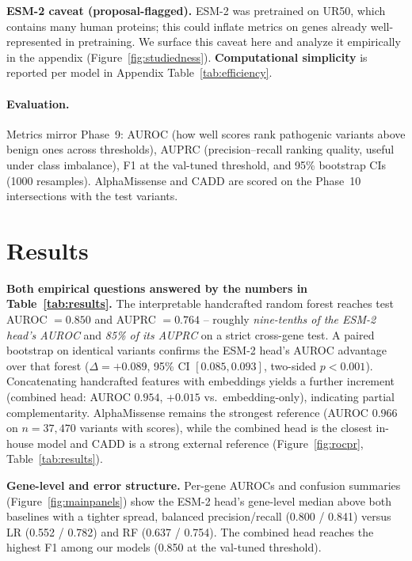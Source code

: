 \documentclass[11pt,letterpaper]{article}
\begin{document}
\textbf{ESM-2 caveat (proposal-flagged).} ESM-2 was pretrained on UR50, which contains many human proteins; this could inflate metrics on genes already well-represented in pretraining. We surface this caveat here and analyze it empirically in the appendix (Figure~\ref{fig:studiedness}). \textbf{Computational simplicity} is reported per model in Appendix Table~\ref{tab:efficiency}.

\paragraph{Evaluation.}
Metrics mirror Phase~9: AUROC (how well scores rank pathogenic variants above benign ones across thresholds), AUPRC (precision--recall ranking quality, useful under class imbalance), F1 at the val-tuned threshold, and 95\% bootstrap CIs (1000 resamples). AlphaMissense and CADD are scored on the Phase~10 intersections with the test variants.

\section*{Results}

\textbf{Both empirical questions answered by the numbers in Table~\ref{tab:results}.}
The interpretable handcrafted random forest reaches test AUROC $= 0.850$ and AUPRC $= 0.764$ -- roughly \emph{nine-tenths of the ESM-2 head's AUROC} and \emph{85\% of its AUPRC} on a strict cross-gene test. A paired bootstrap on identical variants confirms the ESM-2 head's AUROC advantage over that forest ($\Delta = +0.089$, 95\% CI $[0.085, 0.093]$, two-sided $p < 0.001$). Concatenating handcrafted features with embeddings yields a further increment (combined head: AUROC $0.954$, +$0.015$ vs.\ embedding-only), indicating partial complementarity. AlphaMissense remains the strongest reference (AUROC $0.966$ on $n=37{,}470$ variants with scores), while the combined head is the closest in-house model and CADD is a strong external reference (Figure~\ref{fig:rocpr}, Table~\ref{tab:results}).

\textbf{Gene-level and error structure.}
Per-gene AUROCs and confusion summaries (Figure~\ref{fig:mainpanels}) show the ESM-2 head's gene-level median above both baselines with a tighter spread, balanced precision/recall (0.800 / 0.841) versus LR (0.552 / 0.782) and RF (0.637 / 0.754). The combined head reaches the highest F1 among our models (0.850 at the val-tuned threshold).
\end{document}
